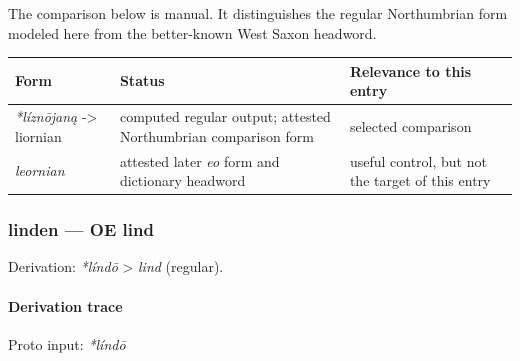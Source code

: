 \documentclass[
  british,
  a4paper,
]{article}
\newcounter{none} %
\begin{document}
The comparison below is manual. It distinguishes the regular
Northumbrian form modeled here from the better-known West Saxon
headword.

{\def\LTcaptype{none} %
\begin{longtable}[]{@{}
  >{\raggedright\arraybackslash}p{}
  >{\raggedright\arraybackslash}p{}
  >{\raggedright\arraybackslash}p{}@{}}
\toprule\noalign{}
\begin{minipage}[b]{\linewidth}\raggedright
Form
\end{minipage} & \begin{minipage}[b]{\linewidth}\raggedright
Status
\end{minipage} & \begin{minipage}[b]{\linewidth}\raggedright
Relevance to this entry
\end{minipage} \\
\midrule\noalign{}
\endhead
\bottomrule\noalign{}
\endlastfoot
\emph{*líznōjaną} -\textgreater{} liornian & computed regular output;
attested Northumbrian comparison form & selected comparison \\
\emph{leornian} & attested later \emph{eo} form and dictionary headword
& useful control, but not the target of this entry \\
\end{longtable}
}

\subsubsection{linden --- OE lind}\label{linden-oe-lind-1}

Derivation: \emph{*líndō} \textgreater{} \emph{lind} (regular).

\paragraph{Derivation trace}\label{derivation-trace-20}

Proto input: \emph{*líndō}

\begingroup
\setlength{\fboxsep}{6pt}
\end{document}
